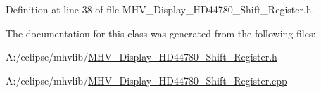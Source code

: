 \-Definition at line 38 of file \-M\-H\-V\-\_\-\-Display\-\_\-\-H\-D44780\-\_\-\-Shift\-\_\-\-Register.\-h.



\-The documentation for this class was generated from the following files\-:\begin{DoxyCompactItemize}
\item 
\-A\-:/eclipse/mhvlib/\hyperlink{_m_h_v___display___h_d44780___shift___register_8h}{\-M\-H\-V\-\_\-\-Display\-\_\-\-H\-D44780\-\_\-\-Shift\-\_\-\-Register.\-h}\item 
\-A\-:/eclipse/mhvlib/\hyperlink{_m_h_v___display___h_d44780___shift___register_8cpp}{\-M\-H\-V\-\_\-\-Display\-\_\-\-H\-D44780\-\_\-\-Shift\-\_\-\-Register.\-cpp}\end{DoxyCompactItemize}
